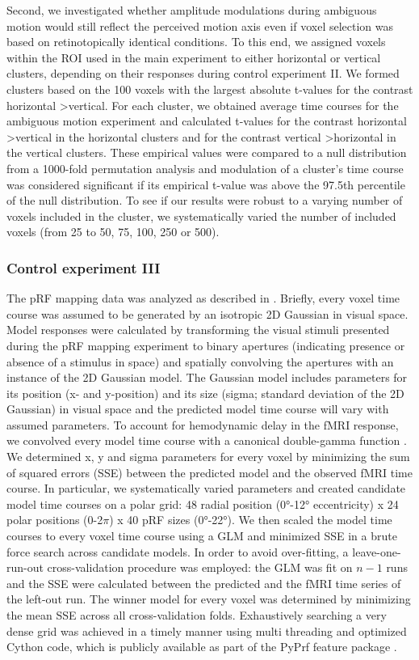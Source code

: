 Second, we investigated whether amplitude modulations during ambiguous motion would still reflect the perceived motion axis even if voxel selection was based on retinotopically identical conditions. To this end, we assigned voxels within the ROI used in the main experiment to either horizontal or vertical clusters, depending on their responses during control experiment II. We formed clusters based on the 100 voxels with the largest absolute t-values for the contrast horizontal \textgreater vertical. For each cluster, we obtained average time courses for the ambiguous motion experiment and calculated t-values for the contrast horizontal \textgreater vertical in the horizontal clusters and for the contrast vertical \textgreater horizontal in the vertical clusters. These empirical values were compared to a null distribution from a 1000-fold permutation analysis and modulation of a cluster's time course was considered significant if its empirical t-value was above the 97.5th percentile of the null distribution. To see if our results were robust to a varying number of voxels included in the cluster, we systematically varied the number of included voxels (from 25 to 50, 75, 100, 250 or 500).

\subsubsection{Control experiment III}
The pRF mapping data was analyzed as described in \cite{Dumoulin2008}. Briefly, every voxel time course was assumed to be generated by an isotropic 2D Gaussian in visual space. Model responses were calculated by transforming the visual stimuli presented during the pRF mapping experiment to binary apertures (indicating presence or absence of a stimulus in space) and spatially convolving the apertures with an instance of the 2D Gaussian model. The Gaussian model includes parameters for its position (x- and y-position) and its size (sigma; standard deviation of the 2D Gaussian) in visual space and the predicted model time course will vary with assumed parameters. To account for hemodynamic delay in the fMRI response, we convolved every model time course with a canonical double-gamma function \parencite{Friston1998}. We determined x, y and sigma parameters for every voxel by minimizing the sum of squared errors (SSE) between the predicted model and the observed fMRI time course. In particular, we systematically varied parameters and created candidate model time courses on a polar grid: 48 radial position (0°-12° eccentricity) x 24 polar positions (0-2$\pi$) x 40 pRF sizes (0°-22°). We then scaled the model time courses to every voxel time course using a GLM and minimized SSE in a brute force search across candidate models. In order to avoid over-fitting, a leave-one-run-out cross-validation procedure was employed: the GLM was fit on $n-1$ runs and the SSE were calculated between the predicted and the fMRI time series of the left-out run. The winner model for every voxel was determined by minimizing the mean SSE across all cross-validation folds. Exhaustively searching a very dense grid was achieved in a timely manner using multi threading and optimized Cython code, which is publicly available as part of the PyPrf feature package \parencite{pyprf_feature}.

